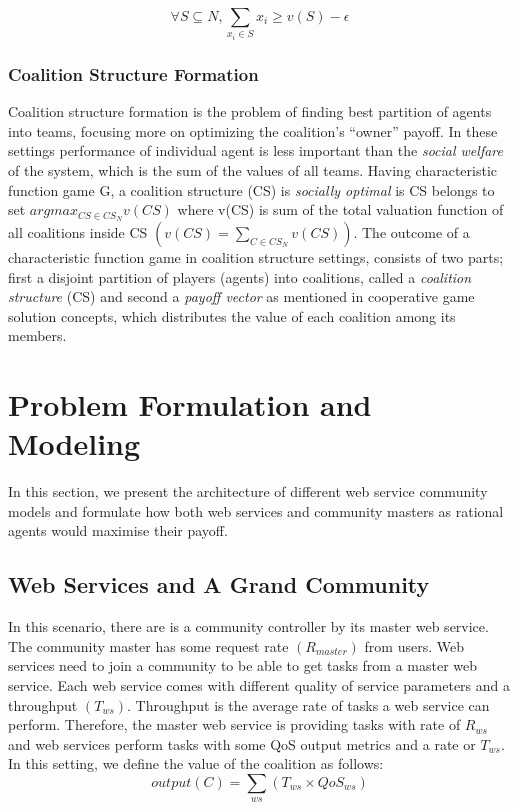 \documentclass[10pt, conference, compsocconf]{IEEEtran}
\theoremstyle{plain}
\theoremstyle{definition}
\begin{document}
\begin{equation}\label{eq:core}
\forall S \subseteq N, \sum_{x_i \in S} x_i \geq v(S) - \epsilon
\end{equation}

\subsubsection{Coalition Structure Formation}\label{sec:coalition}

Coalition structure formation is the problem of finding best partition of agents into teams, focusing more on optimizing the coalition's ``owner'' payoff. In these settings performance of individual agent is less important than the \emph{social welfare} of the system, which is the sum of the values of all teams. Having characteristic function game G, a coalition structure (CS) is \emph{socially optimal} is CS belongs to set $argmax_{CS \in CS_N}v(CS)$ where v(CS) is sum of the total valuation function of all coalitions inside CS $(v(CS) = \sum_{C \in CS_N}v(CS))$. The outcome of a characteristic function game in coalition structure settings, consists of two parts; first a disjoint partition of players (agents) into coalitions, called a \emph{coalition structure} (CS) and second a \emph{payoff vector} as mentioned in cooperative game solution concepts, which distributes the value of each coalition among its members.

\section{Problem Formulation and Modeling}

In this section, we present the architecture of different web service community models and formulate how both web services and community masters as rational agents would maximise their payoff.

\subsection {Web Services and A Grand Community}

In this scenario, there are is a community controller by its master web service. The community master has some request rate $(R_{master})$ from users. Web services need to join a community to be able to get tasks from a master web service. Each web service comes with different quality of service parameters and a throughput $(T_{ws})$. Throughput is the average rate of tasks a web service can perform. Therefore, the master web service is providing tasks with rate of $R_{ws}$ and web services perform tasks with some QoS output metrics and a rate or $T_{ws}$. 
In this setting, we define the value of the coalition as follows:
\begin{equation*}
output(C) = \sum_{ws}{(T_{ws} \times QoS_{ws})}
\end{equation*}
\end{document}
